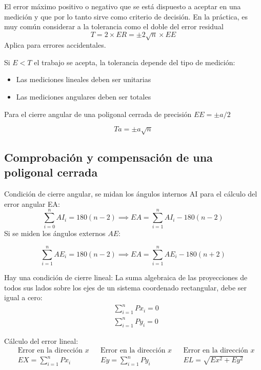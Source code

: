 El error máximo positivo o negativo que se está dispuesto a aceptar en una medición y que por lo tanto sirve como criterio de decisión. En la práctica, es muy común considerar a la tolerancia como el doble del error residual
\begin{equation}
    T=2\times ER=\pm 2\sqrt{n}\times EE
\end{equation}
Aplica para errores accidentales.

Si $E<T$ el trabajo se acepta, la tolerancia depende del tipo de medición:

\begin{itemize}
    \item Las mediciones lineales deben ser unitarias
    \item Las mediciones angulares deben ser totales
\end{itemize}


Para el cierre angular de una poligonal cerrada de precisión $EE=\pm a/2$

\begin{equation}
    Ta=\pm a\sqrt{n}
\end{equation}


\subsection{Comprobación y compensación de una poligonal cerrada}

Condición de cierre angular, se midan los ángulos internos AI para el cálculo del error angular EA:
\begin{equation*}
    \sum_{i=0}^nAI_i=180(n-2)\implies EA=\sum_{i=1}^nAI_i-180(n-2)
\end{equation*}
Si se miden los ángulos externos $AE:$

\begin{equation*}
    \sum_{i=1}^nAE_i=180(n-2)\implies EA=\sum_{i=1}^nAE_i-180(n+2)
\end{equation*}

Hay una condición de cierre lineal: La suma algebraica de las proyecciones de todos sus lados sobre los ejes de un sistema coordenado rectangular, debe ser igual a cero: 
\begin{align*}
    &\sum_{i=1}^nPx_i=0\\
    &\sum_{i=1}^nPy_i=0
\end{align*}

Cálculo del error lineal:
\begin{align*}
    &\text{Error en la dirección }x&&\text{Error en la dirección }x&&\text{Error en la dirección }x\\
    &EX=\sum_{i=1}^nPx_i&&Ey=\sum_{i=1}^nPy_i&&EL=\sqrt{Ex^2+Ey^2}
\end{align*}

